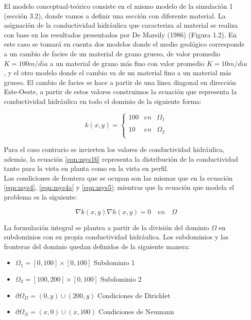 El modelo conceptual-teórico consiste en el mismo modelo de la simulación 1 (sección 3.2), donde vamos a definir  una sección con diferente material. La asignación de la conductividad hidráulica que caracteriza al material se realiza con base en los resultados presentados por De Marsily (1986) (Figura 1.2). En este caso se tomará en cuenta dos modelos donde el medio geológico corresponde a un cambio de facies de un material de grano grueso, de valor promedio $K=100 m/d{\acute{i}}a$ a un material de grano más fino con valor promedio $K=10 m/d{\acute{i}}a$, y el otro modelo donde el cambio va de un material fino a un material más grueso. El cambio de facies se hace a partir de una linea diagonal en dirección Este-Oeste, a partir de estos valores construimos la ecuación que representa la conductividad hidráulica en todo el dominio de la siguiente forma:

\begin{equation}
 \label{eqn:mys16}
    k(x,y)= \left\{ \begin{array}{lcc}
             100 &   en  & {\Omega}_{1} \\
             \\ 10 &  en & {\Omega}_{2} \\
             
             \end{array}
   \right.
\end{equation}

Para el caso contrario se invierten los valores de conductividad hidráulica, además, la ecuación \ref{eqn:mys16} representa la distribución de la conductividad tanto para la vista en planta como en la vista en perfil.
\\

Las condiciones de frontera que se ocupan son las mismas que en la ecuación \ref{eqn:mys4}, \ref{eqn:mys4a} y \ref{eqn:mys5}; mientras que la ecuación que modela el problema es la siguiente:

\begin{equation}
 \label{eqn:mys17}
 {\nabla}k(x,y){\nabla}h(x,y)=0 \quad en \quad \Omega
\end{equation} 

La formulación integral se plantea a partir de la división del dominio $\Omega$ en subdominios con su propia conductividad hidráulica. Los subdominios y las fronteras del dominio quedan definidos de la siguiente manera:

\begin{itemize}
\item  ${\Omega}_{1}=[0,100]{\times}[0,100]$ Subdominio 1
\item  ${\Omega}_{2}=[100,200]{\times}[0,100]$ Subdominio 2
\item  ${\partial}\Omega_{D}={(0,y){\cup}(200,y)}$ Condiciones de Dirichlet
\item  ${\partial}\Omega_{N}={(x,0){\cup}(x,100)}$ Condiciones de Neumann
\end{itemize}

